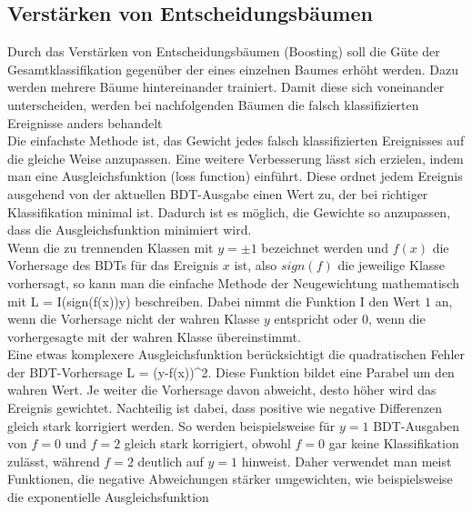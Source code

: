 
\subsection{Verst\"arken von Entscheidungsb\"aumen}
\label{ch:Algorithmen:subsec:Boosting}

Durch das Verst\"arken von Entscheidungsb\"aumen (Boosting) soll die G\"ute der Gesamtklassifikation gegen\"uber der eines einzelnen Baumes erh\"oht werden. Dazu werden mehrere B\"aume hintereinander trainiert. Damit diese sich voneinander unterscheiden, werden bei nachfolgenden B\"aumen die falsch klassifizierten Ereignisse anders behandelt\\
Die einfachste Methode ist, das Gewicht jedes falsch klassifizierten Ereignisses auf die gleiche Weise anzupassen. Eine weitere Verbesserung l\"asst sich erzielen, indem man eine Ausgleichsfunktion (loss function) einf\"uhrt. Diese ordnet jedem Ereignis ausgehend von der aktuellen BDT-Ausgabe einen Wert zu, der bei richtiger Klassifikation minimal ist. Dadurch ist es m\"oglich, die Gewichte so anzupassen, dass die Ausgleichsfunktion minimiert wird.\\
Wenn die zu trennenden Klassen mit $y=\pm1$ bezeichnet werden und $f(x)$ die Vorhersage des BDTs f\"ur das Ereignis $x$ ist, also $sign(f)$ die jeweilige Klasse vorhersagt, so kann man die einfache Methode der Neugewichtung mathematisch mit
\beq
L = I(sign(f(x))\neq y)
\label{eq:missclass_loss}
\eeq
beschreiben. Dabei nimmt die Funktion I den Wert $1$ an, wenn die Vorhersage nicht der wahren Klasse $y$ entspricht oder $0$, wenn die vorhergesagte mit der wahren Klasse \"ubereinstimmt.\\
Eine etwas komplexere Ausgleichsfunktion ber\"ucksichtigt die quadratischen Fehler der BDT-Vorhersage
\beq
L = (y-f(x))^2.
\label{eq:squarederror_loss}
\eeq
Diese Funktion bildet eine Parabel um den wahren Wert. Je weiter die Vorhersage davon abweicht, desto h\"oher wird das Ereignis gewichtet. Nachteilig ist dabei, dass positive wie negative Differenzen gleich stark korrigiert werden. So werden beispielsweise f\"ur $y=1$ BDT-Ausgaben von $f=0$ und $f=2$ gleich stark korrigiert, obwohl $f=0$ gar keine Klassifikation zul\"asst, w\"ahrend $f=2$ deutlich auf $y=1$ hinweist. Daher verwendet man meist Funktionen, die negative Abweichungen st\"arker umgewichten, wie beispielsweise die exponentielle Ausgleichsfunktion

